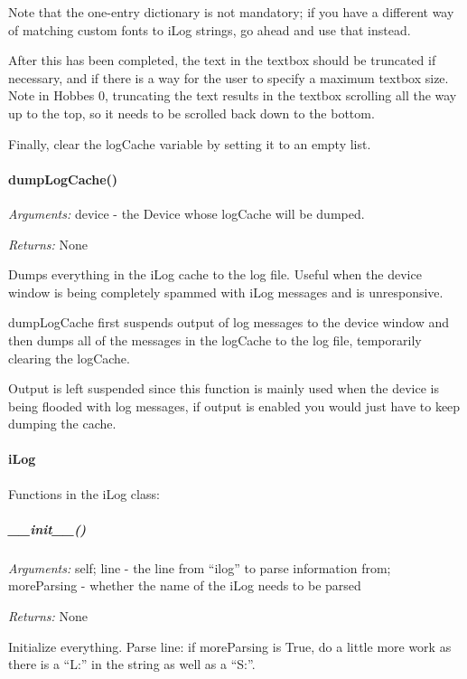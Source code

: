 \documentclass[12pt,letterpaper]{article}
\begin{document}
Note that the one-entry dictionary is not mandatory; if you have a different way of matching custom fonts to iLog strings, go ahead and use that instead.

After this has been completed, the text in the textbox should be truncated if necessary, and if there is a way for the user to specify a maximum textbox size. Note in Hobbes 0, truncating the text results in the textbox scrolling all the way up to the top, so it needs to be scrolled back down to the bottom.

Finally, clear the logCache variable by setting it to an empty list.

%
%
\paragraph{dumpLogCache()}
\label{4.6.1.4}

\emph{Arguments:} device - the Device whose logCache will be dumped.

\emph{Returns:} None

Dumps everything in the iLog cache to the log file. Useful when the device window is being completely spammed with iLog messages and is unresponsive.

dumpLogCache first suspends output of log messages to the device window and then dumps all of the messages in the logCache to the log file, temporarily clearing the logCache.  

Output is left suspended since this function is mainly used when the device is being flooded with log messages, if output is enabled you would just have to keep dumping the cache.

%
%
\paragraph{iLog}
\label{4.6.1.5}

Functions in the iLog class:

\setcounter{subparagraph}{-1}



%
%
\subparagraph{\_\_init\_\_()}
\label{4.6.1.5.0}

\emph{Arguments:} self; line - the line from ``ilog'' to parse information from; moreParsing - whether the name of the iLog needs to be parsed

\emph{Returns:} None

Initialize everything. Parse line: if moreParsing is True, do a little more work as there is a ``L:'' in the string as well as a ``S:''.
\end{document}
